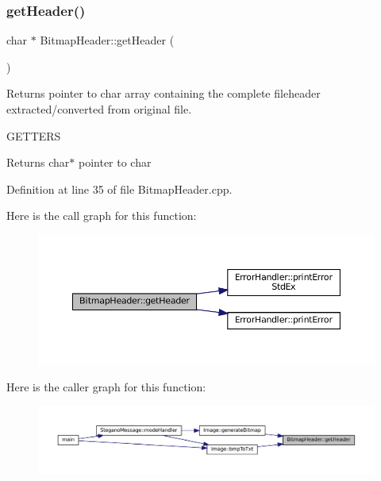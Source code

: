 \subsubsection{\texorpdfstring{getHeader()}{getHeader()}}
{\footnotesize\ttfamily char $\ast$ Bitmap\+Header\+::get\+Header (\begin{DoxyParamCaption}{ }\end{DoxyParamCaption})}



Returns pointer to char array containing the complete fileheader extracted/converted from original file. 

G\+E\+T\+T\+E\+RS\begin{DoxyReturn}{Returns}
char$\ast$ pointer to char 
\end{DoxyReturn}


Definition at line 35 of file Bitmap\+Header.\+cpp.

Here is the call graph for this function\+:\nopagebreak
\begin{figure}[H]
\begin{center}
\leavevmode
\includegraphics[width=350pt]{classBitmapHeader_aa29e1acc8a7a588867039d7c0bdcde04_cgraph}
\end{center}
\end{figure}
Here is the caller graph for this function\+:\nopagebreak
\begin{figure}[H]
\begin{center}
\leavevmode
\includegraphics[width=350pt]{classBitmapHeader_aa29e1acc8a7a588867039d7c0bdcde04_icgraph}
\end{center}
\end{figure}
\mbox{\label{classBitmapHeader_a7ac69b70fce7b54c9cd3134a0e68ea58}} 
